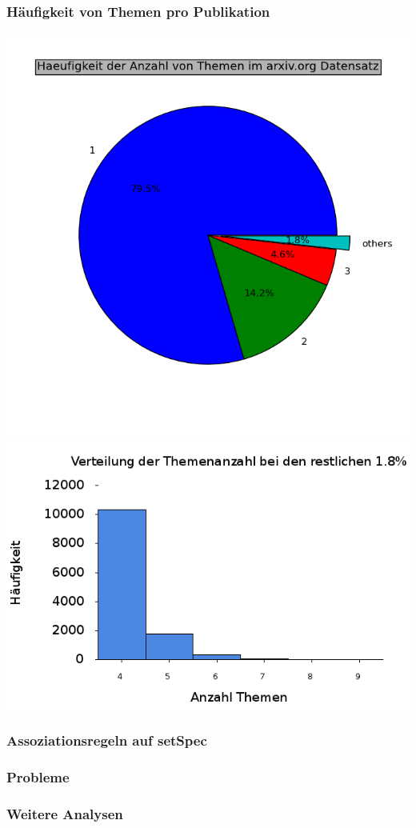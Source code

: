 \documentclass[12pt,utf8]{beamer}
\begin{document}
\begin{frame}
	\frametitle{Häufigkeit von Themen pro Publikation}
    \includegraphics[scale=0.35]{../visual/piechart.png}
    \includegraphics[scale=0.25]{../visual/pieSubplot.png}
\end{frame}
\begin{frame}
	\frametitle{Assoziationsregeln auf setSpec}
\end{frame}
\begin{frame}
	\frametitle{Probleme}
\end{frame}
\begin{frame}
	\frametitle{Weitere Analysen}
\end{frame}
\end{document}
